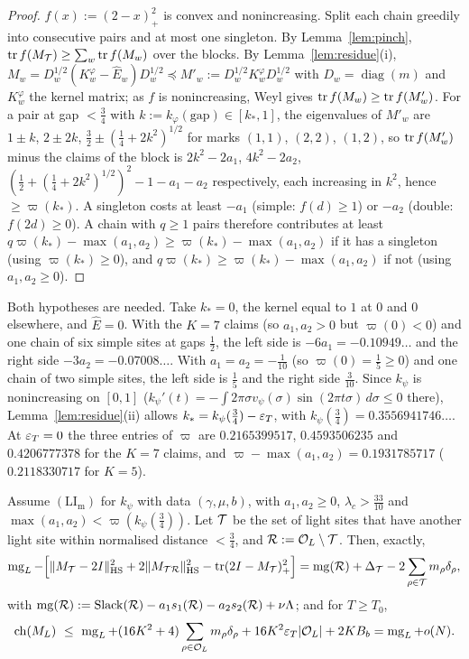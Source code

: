 \begin{proof}
$f(x):=(2-x)_+^2$ is convex and nonincreasing. Split each chain greedily into consecutive pairs and at most one singleton. By
Lemma~\ref{lem:pinch}, $\operatorname{tr} f(M_\mathcal T)\ge\sum_w\operatorname{tr} f(M_w)$ over the blocks. By Lemma~\ref{lem:residue}(i),
$M_w=D_w^{1/2}(K^\varphi_w-\widehat E_w)D_w^{1/2}\preceq M'_w:=D_w^{1/2}K^\varphi_wD_w^{1/2}$ with $D_w=\operatorname{diag}(m)$ and $K^\varphi_w$ the
kernel matrix; as $f$ is nonincreasing, Weyl gives $\operatorname{tr} f(M_w)\ge\operatorname{tr} f(M'_w)$. For a pair at gap $<\frac34$ with $k:=k_\varphi(\text{gap})\in[k_*,1]$,
the eigenvalues of $M'_w$ are $1\pm k$, $2\pm2k$, $\frac32\pm(\frac14+2k^2)^{1/2}$ for marks $(1,1)$, $(2,2)$, $(1,2)$, so $\operatorname{tr} f(M'_w)$ minus the
claims of the block is $2k^2-2a_1$, $4k^2-2a_2$, $(\frac12+(\frac14+2k^2)^{1/2})^2-1-a_1-a_2$ respectively, each increasing in $k^2$, hence
$\ge\varpi(k_*)$. A singleton costs at least $-a_1$ (simple: $f(d)\ge1$) or $-a_2$ (double: $f(2d)\ge0$). A chain with $q\ge1$ pairs therefore
contributes at least $q\varpi(k_*)-\max(a_1,a_2)\ge\varpi(k_*)-\max(a_1,a_2)$ if it has a singleton (using $\varpi(k_*)\ge0$), and $q\varpi(k_*)\ge\varpi(k_*)-\max(a_1,a_2)$
if not (using $a_1,a_2\ge0$).
\end{proof}

Both hypotheses are needed. Take $k_*=0$, the kernel equal to $1$ at $0$ and $0$ elsewhere, and $\widehat E=0$. With the $K=7$ claims (so
$a_1,a_2>0$ but $\varpi(0)<0$) and one chain of six simple sites at gaps $\frac12$, the left side is $-6a_1=-0.10949\ldots$ and the right side
$-3a_2=-0.07008\ldots$. With $a_1=a_2=-\frac1{10}$ (so $\varpi(0)=\frac15\ge0$) and one chain of two simple sites, the left side is $\frac15$ and the right
side $\frac3{10}$. Since $k_\psi$ is nonincreasing on
$[0,1]$ ($k_\psi'(t)=-\int2\pi\sigma v_\psi(\sigma)\sin(2\pi t\sigma)\,d\sigma\le0$ there), Lemma~\ref{lem:residue}(ii) allows
$k_*=k_\psi(\frac34)-\varepsilon_T$, with $k_\psi(\frac34)=0.3556941746\ldots$. At $\varepsilon_T=0$ the three entries of $\varpi$ are $0.2165399517$, $0.4593506235$ and
$0.4206777378$ for the $K=7$ claims, and $\varpi-\max(a_1,a_2)=0.1931785717$ ($0.2118330717$ for $K=5$).

\begin{theorem}\label{thm:OLL}
Assume $(\mathrm{LI}_{\mathrm m})$ for $k_\psi$ with data $(\gamma,\mu,b)$, with $a_1,a_2\ge0$, $\lambda_c>\frac{33}{10}$ and
$\max(a_1,a_2)<\varpi(k_\psi(\frac34))$. Let $\mathcal T$ be the set of light sites that have another light site within normalised distance $<\frac34$, and $\mathcal R:=\mathcal O_L\setminus\mathcal T$.
Then, exactly,
\begin{equation}\label{eq:OLLid}
\operatorname{mg}_L-\Big[\lVert M_\mathcal T-2I\rVert_{\mathrm{HS}}^2+2\lVert M_{\mathcal T\mathcal R}\rVert_{\mathrm{HS}}^2-\operatorname{tr}(2I-M_\mathcal T)_+^2\Big]=\operatorname{mg}(\mathcal R)+\Delta_\mathcal T-2\sum_{\rho\in\mathcal T}m_\rho\delta_\rho,
\end{equation}
with $\operatorname{mg}(\mathcal R):=\operatorname{Slack}(\mathcal R)-a_1s_1(\mathcal R)-a_2s_2(\mathcal R)+\nu\Lambda$; and for $T\ge T_0$,
\[
\ch(M_L)\ \le\ \mg_L+(16K^2+4)\sum_{\rho\in\cO_L}m_\rho\delta_\rho+16K^2\eps_T\abs{\cO_L}+2KB_b=\mg_L+o(N).
\]
\end{theorem}

